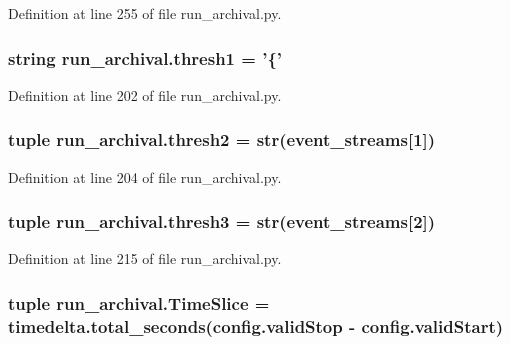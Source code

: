 Definition at line 255 of file run\-\_\-archival.\-py.

\hypertarget{namespacerun__archival_a345979c5efe939df4bbf314d62511433}{
\subsubsection[{thresh1}]{\setlength{\rightskip}{0pt plus 5cm}string run\-\_\-archival.\-thresh1 = '\{'}}\label{namespacerun__archival_a345979c5efe939df4bbf314d62511433}


Definition at line 202 of file run\-\_\-archival.\-py.

\hypertarget{namespacerun__archival_aa0af2b82ec84c97c5e9a4cffcec972c3}{
\subsubsection[{thresh2}]{\setlength{\rightskip}{0pt plus 5cm}tuple run\-\_\-archival.\-thresh2 = str({\bf event\-\_\-streams}\mbox{[}1\mbox{]})}}\label{namespacerun__archival_aa0af2b82ec84c97c5e9a4cffcec972c3}


Definition at line 204 of file run\-\_\-archival.\-py.

\hypertarget{namespacerun__archival_a59a2df7dced0835b40b789af0ee70d18}{
\subsubsection[{thresh3}]{\setlength{\rightskip}{0pt plus 5cm}tuple run\-\_\-archival.\-thresh3 = str({\bf event\-\_\-streams}\mbox{[}2\mbox{]})}}\label{namespacerun__archival_a59a2df7dced0835b40b789af0ee70d18}


Definition at line 215 of file run\-\_\-archival.\-py.

\hypertarget{namespacerun__archival_ad807127baa562a1a1f13c1c41dc9ff7c}{
\subsubsection[{Time\-Slice}]{\setlength{\rightskip}{0pt plus 5cm}tuple run\-\_\-archival.\-Time\-Slice = timedelta.\-total\-\_\-seconds(config.\-valid\-Stop -\/ config.\-valid\-Start)}}\label{namespacerun__archival_ad807127baa562a1a1f13c1c41dc9ff7c}


